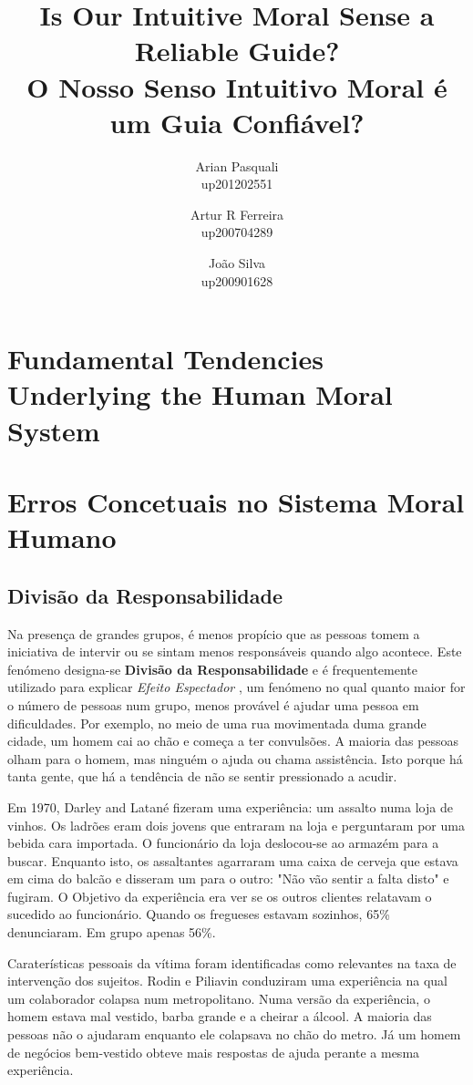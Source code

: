 \documentclass[a4paper,onecolumn,11pt]{article}
\title{Is Our Intuitive Moral Sense a Reliable Guide?\\O Nosso Senso Intuitivo Moral é um Guia Confiável? }
\author{Arian Pasquali\\
	up201202551
	\and 
	Artur R Ferreira\\
	up200704289
	\and
	João Silva\\
	up200901628}
\begin{document}
\maketitle

\begin{abstract}
\end{abstract}


\section{Fundamental Tendencies Underlying the Human Moral System}

\section{Erros Concetuais no Sistema Moral Humano}
	\subsection{Divisão da Responsabilidade}
	Na presença de grandes grupos, é menos propício que as pessoas tomem a iniciativa de intervir ou se sintam menos responsáveis quando algo acontece. Este fenómeno designa-se \textbf{Divisão da Responsabilidade} e é frequentemente utilizado para explicar \textit{Efeito Espectador} \cite{kendra}, um fenómeno no qual quanto maior for o número de pessoas num grupo, menos provável é ajudar uma pessoa em dificuldades. Por exemplo, no meio de uma rua movimentada duma grande cidade, um homem cai ao chão e começa a ter convulsões. A maioria das pessoas olham para o homem, mas ninguém o ajuda ou chama assistência. Isto porque há tanta gente, que há a tendência de não se sentir pressionado a acudir.
	
	Em 1970, Darley and Latané fizeram uma experiência: um assalto numa loja de vinhos. Os ladrões eram dois jovens que entraram na loja e perguntaram por uma bebida cara importada. O funcionário da loja deslocou-se ao armazém para a buscar. Enquanto isto, os assaltantes agarraram uma caixa de cerveja que estava em cima do balcão e disseram um para o outro: "Não vão sentir a falta disto" e fugiram.
	O Objetivo da experiência \cite{pysch} era ver se os outros clientes relatavam o sucedido ao funcionário. Quando os fregueses estavam sozinhos, 65\% denunciaram. Em grupo apenas 56\%. 
	
	Caraterísticas pessoais da vítima foram identificadas como relevantes na taxa de intervenção dos sujeitos. 
	Rodin e Piliavin conduziram uma experiência na qual um colaborador colapsa num metropolitano. Numa versão da experiência, o homem estava mal vestido, barba grande e a cheirar a álcool. A maioria das pessoas não o ajudaram enquanto ele colapsava no chão do metro. Já um homem de negócios bem-vestido obteve mais respostas de ajuda perante a mesma experiência.
	
\end{document}
